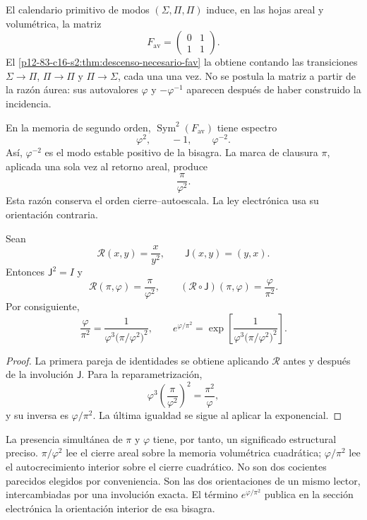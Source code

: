 El calendario primitivo de modos
\((\Sigma,\Pi,\Pi)\) induce, en las hojas areal y volumétrica, la matriz
\[
 F_{\mathrm{av}}
 =
 \begin{pmatrix}
 0&1\\
 1&1
 \end{pmatrix}.
\]
El \cref{p12-83-c16-s2:thm:descenso-necesario-fav} la obtiene contando las transiciones
\(\Sigma\to\Pi\), \(\Pi\to\Pi\) y \(\Pi\to\Sigma\), cada una una vez.
No se postula la matriz a partir de la razón áurea: sus autovalores
\(\varphi\) y \(-\varphi^{-1}\) aparecen después de haber construido la
incidencia.

En la memoria de segundo orden,
\(\operatorname{Sym}^2(F_{\mathrm{av}})\) tiene espectro
\[
 \varphi^2,\qquad -1,\qquad\varphi^{-2}.
\]
Así, \(\varphi^{-2}\) es el modo estable positivo de la bisagra. La marca
de clausura \(\pi\), aplicada una sola vez al retorno areal, produce
\[
 \frac{\pi}{\varphi^2}.
\]
Esta razón conserva el orden cierre--autoescala. La ley electrónica usa su
orientación contraria.

\begin{theorem}
\label{p12-83-c15-s2:thm:espejo-electron-rev6}
Sean
\[
 \mathscr R(x,y)=\frac{x}{y^2},
 \qquad
 \mathsf J(x,y)=(y,x).
\]
Entonces \(\mathsf J^2=I\) y
\[
 \mathscr R(\pi,\varphi)=\frac{\pi}{\varphi^2},
 \qquad
 (\mathscr R\circ\mathsf J)(\pi,\varphi)
 =\frac{\varphi}{\pi^2}.
\]
Por consiguiente,
\[
 \frac{\varphi}{\pi^2}
 =
 \frac{1}{
 \varphi^3\bigl(\pi/\varphi^2\bigr)^2},
 \qquad
 e^{\varphi/\pi^2}
 =
 \exp\!\left[
 \frac{1}{
 \varphi^3\bigl(\pi/\varphi^2\bigr)^2}
 \right].
\]
\end{theorem}

\begin{proof}
La primera pareja de identidades se obtiene aplicando
\(\mathscr R\) antes y después de la involución \(\mathsf J\). Para la
reparametrización,
\[
 \varphi^3
 \left(\frac{\pi}{\varphi^2}\right)^2
 =\frac{\pi^2}{\varphi},
\]
y su inversa es \(\varphi/\pi^2\). La última igualdad se sigue al aplicar
la exponencial.
\end{proof}

La presencia simultánea de \(\pi\) y \(\varphi\) tiene, por tanto, un
significado estructural preciso. \(\pi/\varphi^2\) lee el cierre areal
sobre la memoria volumétrica cuadrática; \(\varphi/\pi^2\) lee el
autocrecimiento interior sobre el cierre cuadrático. No son dos cocientes
parecidos elegidos por conveniencia. Son las dos orientaciones de un mismo
lector, intercambiadas por una involución exacta. El término
\(e^{\varphi/\pi^2}\) publica en la sección electrónica la orientación
interior de esa bisagra.

